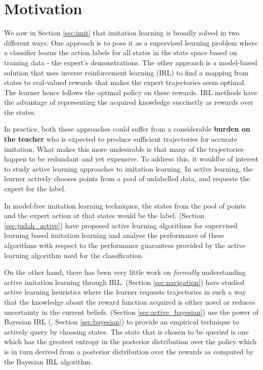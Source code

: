 \section{Motivation}

We saw in Section \ref{sec:imit} that imitation learning is broadly solved in two different ways. One approach is to pose it as a supervised learning problem where a classifier learns the action labels for all states in the state space based on training data - the expert's demonstrations. The other approach is a model-based solution that uses inverse reinforcement learning (IRL) to find a mapping from states to real-valued rewards that makes the expert trajectories seem optimal. The learner hence follows the optimal policy on these rewards. IRL methods have the advantage of representing the acquired knowledge succinctly as rewards over the states.

In practice, both these approaches could suffer from a considerable \textbf{burden on the teacher} who is expected to produce sufficient trajectories for accurate imitation. What makes this more undesirable is that many of the trajectories happen to be redundant and yet expensive. To address this, it wouldbe of interest to study active learning approaches to imitation learning. In active learning, the learner actively chooses points from a pool of unlabelled data, and requests the expert for the label. 

In model-free imitation learning techniques, the states from the pool of points and the expert action at that states would be the label. \citet{DBLP:conf/uai/JudahFD12} (Section \ref{sec:judah_active}) have proposed active learning algorithms for supervised learning based imitation learning and analyse the performance of these algorithms with respect to the performance guarantees provided by the active learning algorithm used for the classification. 


On the other hand, there has been very little work on \textit{formally} understanding active imitation learning through IRL. \citet{DBLP:conf/icra/SilverBS12} (Section \ref{sec:navigation}) have studied active learning heuristics where the learner requests trajectories in such a way that the knowledge about the reward function acquired is either novel or reduces uncertainty in the current beliefs.   \citet{DBLP:conf/pkdd/MeloL10} (Section \ref{sec:active_bayesian}) use the power of Bayesian IRL (\citet{Ramachandran:2007:BIR:1625275.1625692}, Section \ref{sec:bayesian}) to provide an empirical technique to actively query by choosing states. The state that is chosen to be queried is one which has the greatest entropy in the posterior distribution over the policy which is in turn derived from a posterior distribution over the rewards as computed by the Bayesian IRL algorithm. 

